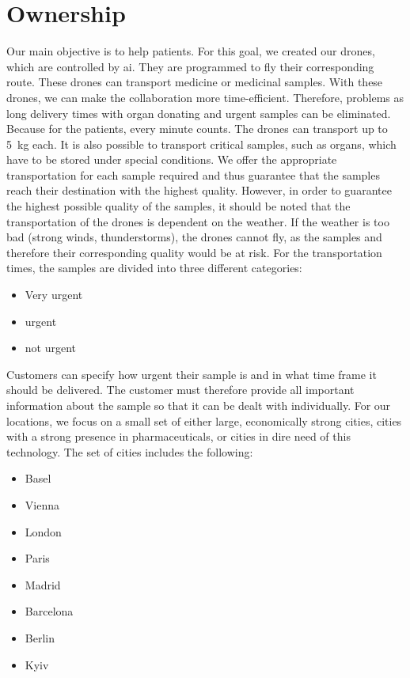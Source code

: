 \chapter{Ownership} \label{ownership}
Our main objective is to help patients. For this goal, we created our drones, which are controlled by \ac{ai}. They are programmed to fly their corresponding route. These drones can transport medicine or medicinal samples. With these drones, we can make the collaboration more time-efficient. Therefore, problems as long delivery times with organ donating and urgent samples can be eliminated. Because for the patients, every minute counts. The drones can transport up to 5 kg each. It is also possible to transport critical samples, such as organs, which have to be stored under special conditions. We offer the appropriate transportation for each sample required and thus guarantee that the samples reach their destination with the highest quality. However, in order to guarantee the highest possible quality of the samples, it should be noted that the transportation of the drones is dependent on the weather. If the weather is too bad (strong winds, thunderstorms), the drones cannot fly, as the samples and therefore their corresponding quality would be at risk. For the transportation times, the samples are divided into three different categories:
\begin{itemize}
  \item Very urgent
  \item urgent
  \item not urgent
\end{itemize}
Customers can specify how urgent their sample is and in what time frame it should be delivered. The customer must therefore provide all important information about the sample so that it can be dealt with individually.
\newline
\newline
For our locations, we focus on a small set of either large, economically strong cities, cities with a strong presence in pharmaceuticals, or cities in dire need of this technology. The set of cities includes the following:
\begin{itemize}
  \item Basel
  \item Vienna
  \item London
  \item Paris
  \item Madrid
  \item Barcelona
  \item Berlin
  \item Kyiv
\end{itemize}
